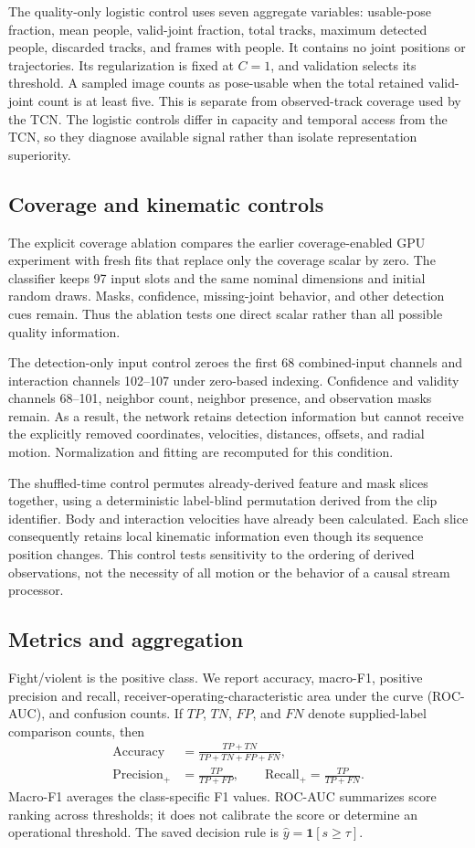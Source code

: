 The quality-only logistic control uses seven aggregate variables: usable-pose fraction, mean people, valid-joint fraction, total tracks, maximum detected people, discarded tracks, and frames with people. It contains no joint positions or trajectories. Its regularization is fixed at $C=1$, and validation selects its threshold. A sampled image counts as pose-usable when the total retained valid-joint count is at least five. This is separate from observed-track coverage used by the TCN. The logistic controls differ in capacity and temporal access from the TCN, so they diagnose available signal rather than isolate representation superiority.

\subsection{Coverage and kinematic controls}
The explicit coverage ablation compares the earlier coverage-enabled GPU experiment with fresh fits that replace only the coverage scalar by zero. The classifier keeps 97 input slots and the same nominal dimensions and initial random draws. Masks, confidence, missing-joint behavior, and other detection cues remain. Thus the ablation tests one direct scalar rather than all possible quality information.

The detection-only input control zeroes the first 68 combined-input channels and interaction channels 102--107 under zero-based indexing. Confidence and validity channels 68--101, neighbor count, neighbor presence, and observation masks remain. As a result, the network retains detection information but cannot receive the explicitly removed coordinates, velocities, distances, offsets, and radial motion. Normalization and fitting are recomputed for this condition.

The shuffled-time control permutes already-derived feature and mask slices together, using a deterministic label-blind permutation derived from the clip identifier. Body and interaction velocities have already been calculated. Each slice consequently retains local kinematic information even though its sequence position changes. This control tests sensitivity to the ordering of derived observations, not the necessity of all motion or the behavior of a causal stream processor.

\subsection{Metrics and aggregation}
Fight/violent is the positive class. We report accuracy, macro-F1, positive precision and recall, receiver-operating-characteristic area under the curve (ROC-AUC), and confusion counts. If $TP$, $TN$, $FP$, and $FN$ denote supplied-label comparison counts, then
\begin{align}
\mathrm{Accuracy}&=\frac{TP+TN}{TP+TN+FP+FN},\\
\mathrm{Precision}_{+}&=\frac{TP}{TP+FP},\qquad
\mathrm{Recall}_{+}=\frac{TP}{TP+FN}.
\end{align}
Macro-F1 averages the class-specific F1 values. ROC-AUC summarizes score ranking across thresholds; it does not calibrate the score or determine an operational threshold. The saved decision rule is $\widehat{y}=\mathbf{1}[s\geq\tau]$.

